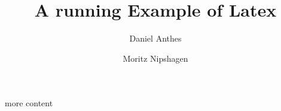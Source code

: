\documentclass[12pt]{scrarticle}
\title{A running Example of Latex}
\author{Daniel Anthes \and Moritz Nipshagen}
\date{} %
\begin{document}
\maketitle

more content
\end{document}
